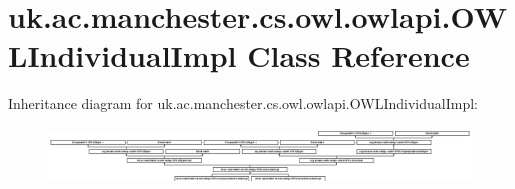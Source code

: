 \hypertarget{classuk_1_1ac_1_1manchester_1_1cs_1_1owl_1_1owlapi_1_1_o_w_l_individual_impl}{\section{uk.\-ac.\-manchester.\-cs.\-owl.\-owlapi.\-O\-W\-L\-Individual\-Impl Class Reference}
\label{classuk_1_1ac_1_1manchester_1_1cs_1_1owl_1_1owlapi_1_1_o_w_l_individual_impl}
}
Inheritance diagram for uk.\-ac.\-manchester.\-cs.\-owl.\-owlapi.\-O\-W\-L\-Individual\-Impl\-:\begin{figure}[H]
\begin{center}
\leavevmode
\includegraphics[height=1.497326cm]{classuk_1_1ac_1_1manchester_1_1cs_1_1owl_1_1owlapi_1_1_o_w_l_individual_impl}
\end{center}
\end{figure}
